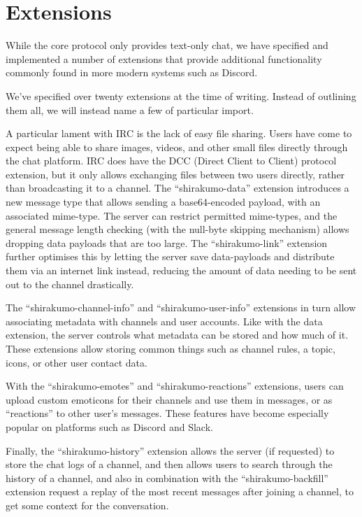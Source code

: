 \documentclass[format=sigconf]{acmart}
\begin{document}
\section{Extensions}\label{extensions}
While the core protocol only provides text-only chat, we have specified and implemented a number of extensions that provide additional functionality commonly found in more modern systems such as Discord.

We've specified over twenty extensions at the time of writing. Instead of outlining them all, we will instead name a few of particular import.

A particular lament with IRC is the lack of easy file sharing. Users have come to expect being able to share images, videos, and other small files directly through the chat platform. IRC does have the DCC (Direct Client to Client) protocol extension, but it only allows exchanging files between two users directly, rather than broadcasting it to a channel. The ``shirakumo-data'' extension introduces a new message type that allows sending a base64-encoded payload, with an associated mime-type. The server can restrict permitted mime-types, and the general message length checking (with the null-byte skipping mechanism) allows dropping data payloads that are too large. The ``shirakumo-link'' extension further optimises this by letting the server save data-payloads and distribute them via an internet link instead, reducing the amount of data needing to be sent out to the channel drastically.

The ``shirakumo-channel-info'' and ``shirakumo-user-info'' extensions in turn allow associating metadata with channels and user accounts. Like with the data extension, the server controls what metadata can be stored and how much of it. These extensions allow storing common things such as channel rules, a topic, icons, or other user contact data.

With the ``shirakumo-emotes'' and ``shirakumo-reactions'' extensions, users can upload custom emoticons for their channels and use them in messages, or as ``reactions'' to other user's messages. These features have become especially popular on platforms such as Discord and Slack.

Finally, the ``shirakumo-history'' extension allows the server (if requested) to store the chat logs of a channel, and then allows users to search through the history of a channel, and also in combination with the ``shirakumo-backfill'' extension request a replay of the most recent messages after joining a channel, to get some context for the conversation.
\end{document}

